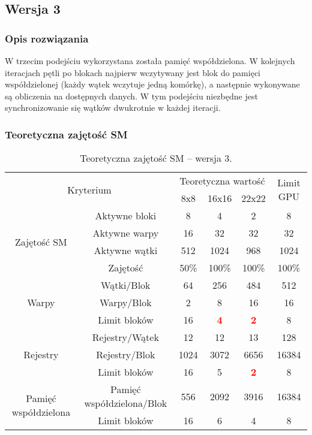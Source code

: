 \newpage
\subsection{Wersja 3}

\subsubsection{Opis rozwiązania}

W trzecim podejściu wykorzystana została pamięć współdzielona. W kolejnych iteracjach pętli po blokach najpierw wczytywany jest blok do pamięci współdzielonej (każdy wątek wczytuje jedną komórkę), a następnie wykonywane są obliczenia na dostępnych danych. W tym podejściu niezbędne jest synchronizowanie się wątków dwukrotnie w każdej iteracji.



\subsubsection{Teoretyczna zajętość SM}

\begin{center}
\begin{table}[H]
\centering
\begin{tabular}{|c|c|c|c|c|c|}
\hline
\multicolumn{2}{|c|}{\multirow{2}{*}{Kryterium}} & \multicolumn{3}{c|}{Teoretyczna wartość} & \multirow{2}{*}{Limit GPU} \\ \cline{3-5}
\multicolumn{2}{|c|}{} & 8x8 & 16x16 & 22x22 & \\ \hline
\multirow{4}{*}{Zajętość SM} & Aktywne bloki & 8 & 4 & 2 & 8 \\ \cline{2-6}
& Aktywne warpy & 16 & 32 & 32 & 32 \\ \cline{2-6}
& Aktywne wątki & 512 & 1024 & 968 & 1024 \\ \cline{2-6}
& Zajętość & 50\% & 100\% & 100\% & 100\% \\ \hline
\multirow{3}{*}{Warpy} & Wątki/Blok & 64 & 256 & 484 & 512 \\ \cline{2-6}
& Warpy/Blok & 2 & 8 & 16 & 16 \\ \cline{2-6}
& Limit bloków & 16 & \textcolor{red}{\textbf{4}} & \textcolor{red}{\textbf{2}} & 8 \\ \hline
\multirow{3}{*}{Rejestry} & Rejestry/Wątek & 12 & 12 & 13 & 128 \\ \cline{2-6}
& Rejestry/Blok & 1024 & 3072 & 6656 & 16384 \\ \cline{2-6}
& Limit bloków & 16 & 5 & \textcolor{red}{\textbf{2}} & 8 \\ \hline
\multirow{2}{*}{Pamięć współdzielona} & Pamięć współdzielona/Blok & 556 & 2092 & 3916 & 16384 \\ \cline{2-6}
& Limit bloków & 16 & 6 & 4 & 8 \\ \hline
\end{tabular}
\caption{Teoretyczna zajętość SM -- wersja 3.}
\end{table}
\end{center}

